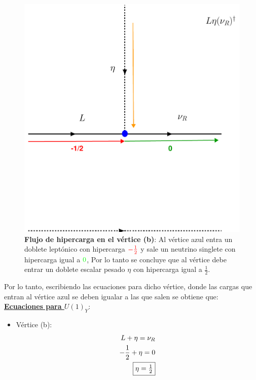 \documentclass[12pt]{article}
\begin{document}
\begin{figure}[h!]
  \begin{center}
  \includegraphics[scale=0.6]{Flujohyer(a).pdf}
\caption{{\textbf{Flujo de hipercarga en el vértice (b)}: Al vértice azul entra un doblete leptónico con hipercarga $\color{red}
-\frac{1}{2}$ y sale un neutrino singlete con hipercarga igual a $\color{green} 0 $, Por lo tanto se concluye que al vértice debe entrar un doblete escalar pesado $\eta$ con hipercarga igual a $ \frac{1}{2}$.}}
\label{fig:Hypercharge(a)}
\end{center}
\end{figure}

Por lo tanto, escribiendo las ecuaciones para dicho vértice, donde las cargas que entran al vértice azul se deben igualar a las que salen se obtiene que: \\

     \underline{\textbf{Ecuaciones para $U(1)_Y$}}:  
\begin{itemize}
    \item Vértice (b):
    \begin{equation}
    \label{eq:eqforhypercharge}
    \begin{aligned}
            L+\eta=\nu_R \\
            -\frac{1}{2} + \eta = 0 \\
            \fbox{$ \eta=\frac{1}{2}$}
    \end{aligned}
    \end{equation}
\end{itemize}
\end{document}
